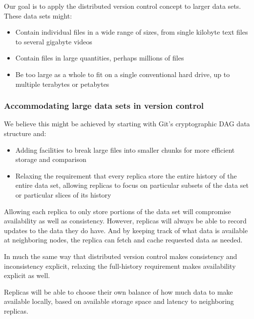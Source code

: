 \documentclass[a4paper]{article}
\begin{document}
Our goal is to apply the distributed version control concept to larger data
sets.
These data sets might:

\begin{itemize}

  \item Contain individual files in a wide range of sizes, from single kilobyte
    text files to several gigabyte videos

  \item Contain files in large quantities, perhaps millions of files

  \item Be too large as a whole to fit on a single conventional hard drive, up
    to multiple terabytes or petabytes

\end{itemize}

\subsubsection{Accommodating large data sets in version control}

We believe this might be achieved by starting with Git's cryptographic DAG data
structure and:

\begin{itemize}

  \item Adding facilities to break large files into smaller chunks for more
    efficient storage and comparison

  \item Relaxing the requirement that every replica store the entire history of
    the entire data set, allowing replicas to focus on particular subsets of the
    data set or particular slices of its history

\end{itemize}

Allowing each replica to only store portions of the data set will compromise
availability as well as consistency.
However, replicas will always be able to record updates to the data they do
have.
And by keeping track of what data is available at neighboring nodes, the replica
can fetch and cache requested data as needed.

In much the same way that distributed version control makes consistency and
inconsistency explicit, relaxing the full-history requirement makes availability
explicit as well.

Replicas will be able to choose their own balance of how much data to make
available locally, based on available storage space and latency to neighboring
replicas.
\end{document}
